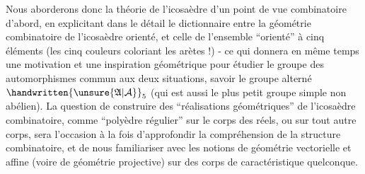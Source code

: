Nous aborderons donc la théorie de l'icosaèdre d'un point de vue combinatoire d'abord, en explicitant dans le détail le dictionnaire entre la géométrie combinatoire de l'icosaèdre orienté, et celle de l'ensemble ``orienté'' à cinq éléments (les cinq couleurs coloriant les arètes !) - ce qui donnera en même temps une motivation et une inspiration géométrique pour étudier le groupe des automorphismes commun aux deux situations, savoir le groupe alterné
$\handwritten{\unsure{\mathfrak A|\mathcal A}}_5$ (qui est aussi le plus petit groupe simple non abélien). La question de construire des ``réalisations géométriques'' de l'icosaèdre combinatoire, comme ``polyèdre régulier'' sur le corps des réels, ou sur tout autre corps, sera l'occasion à la fois d'approfondir la compréhension de la structure combinatoire, et de nous familiariser avec les notions de géométrie vectorielle et affine (voire de géométrie projective) sur des corps de caractéristique quelconque.
